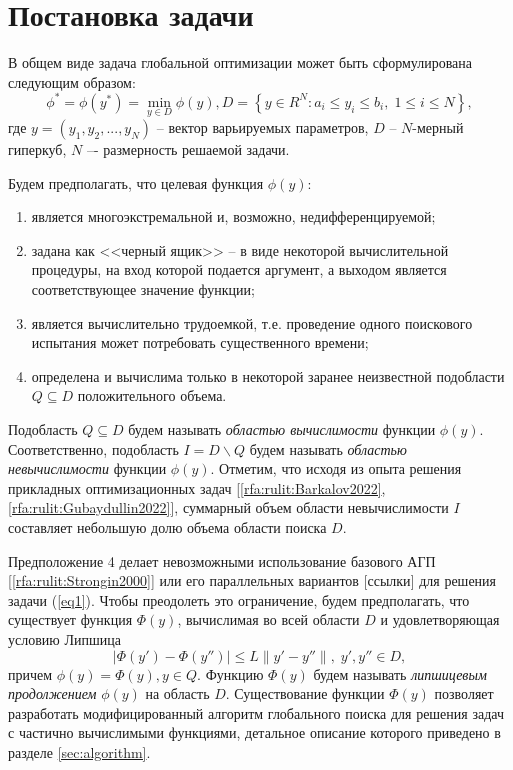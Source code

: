 \documentclass[10pt,a4paper]{book}
\begin{document}
\section{Постановка задачи}

В общем виде задача глобальной оптимизации может быть сформулирована следующим образом:
\begin{equation}\label{eq1} 
\phi^*=\phi(y^* )=\min_{y \in D} \phi(y), D=\left\{ y \in R^N: a_i \leq y_i \leq b_i, \; 1 \leq i \leq N \right\},
\end{equation}
где $y=(y_1,y_2,...,y_N)$ -- вектор варьируемых параметров, $D$ -- $N$-мерный гиперкуб, $N$ –- размерность решаемой задачи.

Будем предполагать, что целевая функция $\phi (y)$:
\begin{enumerate}
\item{является многоэкстремальной и, возможно, недифференцируемой;}
\item {задана как <<черный ящик>> -- в виде некоторой вычислительной процедуры, на вход которой подается аргумент, а выходом является соответствующее значение функции;}
\item{является вычислительно трудоемкой, т.е. проведение одного поискового испытания может потребовать существенного времени;}
\item{определена и вычислима только в некоторой заранее неизвестной подобласти $Q \subseteq D$ положительного объема.}
\end{enumerate}


Подобласть $Q \subseteq D$ будем называть \textit{областью вычислимости} функции $\phi (y)$. 
Соответственно, подобласть $I = D \backslash Q$ будем называть \textit{областью невычислимости} функции $\phi (y)$.
Отметим, что исходя из опыта решения прикладных оптимизационных задач [\ref{rfa:rulit:Barkalov2022},\ref{rfa:rulit:Gubaydullin2022}], суммарный объем области невычислимости $I$ составляет небольшую долю объема области поиска $D$.

Предположение 4 делает невозможными использование базового АГП [\ref{rfa:rulit:Strongin2000}] или его параллельных вариантов [\colorbox[rgb]{1,1,0.6}{ссылки}] для решения задачи (\ref{eq1}).
Чтобы преодолеть это ограничение, будем предполагать, что существует функция $\Phi (y)$, вычислимая во всей области $D$ и удовлетворяющая условию Липшица
\begin{equation}\label{eq3} 
| \Phi (y')-\Phi (y'') | \leq L \| y'-y'' \|, \; y',y'' \in D,
\end{equation}
причем $\phi (y) = \Phi (y), y \in Q$. Функцию $\Phi (y)$ будем называть \textit{липшицевым продолжением} $\phi (y)$ на область $D$. 
Существование функции $\Phi (y)$ позволяет разработать модифицированный алгоритм глобального поиска для решения задач с частично вычислимыми функциями, детальное описание которого приведено в разделе \ref{sec:algorithm}. 
\end{document}
